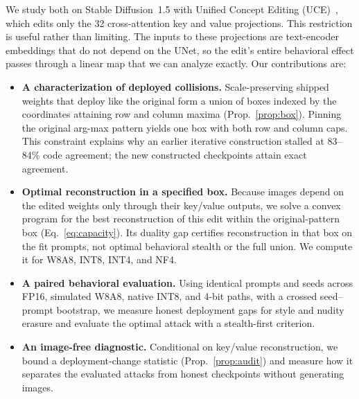 \documentclass[conference]{IEEEtran}
\begin{document}
We study both on Stable Diffusion~1.5 with Unified Concept Editing
(UCE)~\cite{uce}, which edits only the 32 cross-attention key and value
projections. This restriction is useful rather than limiting. The inputs to these
projections are text-encoder embeddings that do not depend on the UNet, so the edit's
entire behavioral effect passes through a linear map that we can analyze exactly.
Our contributions are:

\begin{itemize}
\item \textbf{A characterization of deployed collisions.} Scale-preserving shipped
weights that deploy like the original form a union of boxes indexed by the coordinates
attaining row and column maxima (Prop.~\ref{prop:box}). Pinning the original arg-max
pattern yields one box with both row and column caps. This constraint explains why an
earlier iterative construction stalled at 83--84\% code agreement; the new constructed
checkpoints attain exact agreement.
\item \textbf{Optimal reconstruction in a specified box.} Because images depend on
the edited weights only through their key/value outputs, we solve a convex program
for the best reconstruction of this edit within the original-pattern box
(Eq.~\ref{eq:capacity}). Its duality gap certifies reconstruction in that box on the fit
prompts, not optimal behavioral stealth or the full union. We compute it for W8A8,
INT8, INT4, and NF4.
\item \textbf{A paired behavioral evaluation.} Using identical prompts and seeds across
FP16, simulated W8A8, native INT8, and 4-bit paths, with a crossed seed--prompt
bootstrap, we measure honest deployment gaps for style and nudity erasure and evaluate
the optimal attack with a stealth-first criterion.
\item \textbf{An image-free diagnostic.} Conditional on key/value reconstruction,
we bound a deployment-change statistic (Prop.~\ref{prop:audit}) and measure how it
separates the evaluated attacks from honest checkpoints without generating images.
\end{itemize}
\end{document}
